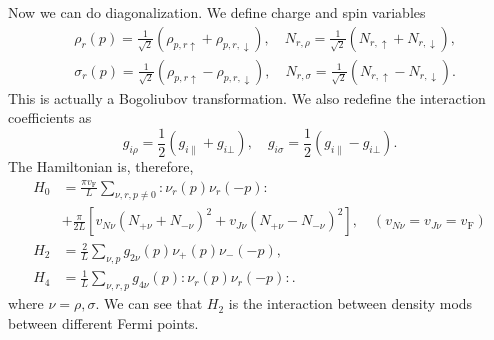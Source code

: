 \documentclass[hyperref, a4paper]{article}
\begin{document}
Now we can do diagonalization. We define charge and spin variables 
\begin{equation}
    \begin{aligned}
        &\rho_r(p) = \frac{1}{\sqrt{2}} (\rho_{p, r \uparrow} + \rho_{p, r, \downarrow}), \quad 
        N_{r, \rho} = \frac{1}{\sqrt{2}} (N_{r, \uparrow} + N_{r, \downarrow}), \\
        &\sigma_r(p) = \frac{1}{\sqrt{2}} (\rho_{p, r \uparrow} - \rho_{p, r, \downarrow}), \quad 
        N_{r, \sigma} = \frac{1}{\sqrt{2}} (N_{r, \uparrow} - N_{r, \downarrow}).
    \end{aligned}
\end{equation}
This is actually a Bogoliubov transformation. We also redefine the interaction coefficients as 
\begin{equation}
    g_{i \rho} = \frac{1}{2} (g_{i \parallel} + g_{i \bot}), \quad g_{i \sigma} = \frac{1}{2} (g_{i \parallel} - g_{i \bot}).
\end{equation}
The Hamiltonian is, therefore, 
\begin{equation}
    \begin{aligned}
        H_{0} &=\frac{\pi v_\text{F}}{L} \sum_{\nu, r, p \neq 0}: \nu_{r}(p) \nu_{r}(-p): \\
        &+\frac{\pi}{2 L}\left[v_{N \nu}\left(N_{+\nu}+N_{-\nu}\right)^{2}+v_{J \nu}\left(N_{+\nu}-N_{-\nu}\right)^{2}\right], \quad\left(v_{N \nu}=v_{J \nu}=v_\text{F}\right) \\
        H_{2} &=\frac{2}{L} \sum_{\nu, p} g_{2 \nu}(p) \nu_{+}(p) \nu_{-}(-p), \\
        H_{4} &=\frac{1}{L} \sum_{\nu , r, p} g_{4 \nu}(p): \nu_{r}(p) \nu_{r}(-p):.
        \end{aligned}
\end{equation}
where $\nu = \rho, \sigma$. We can see that $H_2$ is the interaction between density mods between different Fermi points.
\end{document}
